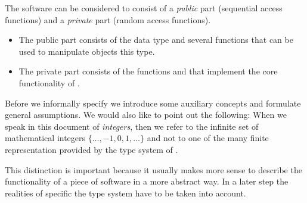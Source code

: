 The \bitwalker software can be considered to consist of a \emph{public} part
(sequential access functions)
and a \emph{private} part (random access functions).

\begin{itemize}
\item
The public part consists of the \isoc data type \bitwalkertype and several \isoc functions
that can be used to manipulate objects this type.

\item
The private part consists of the functions \peek and \poke
that implement the core functionality of \bitwalker.
\end{itemize}

Before we informally specify \bitwalker
we introduce some auxiliary concepts and formulate general assumptions.
We would also like to point out the following:
When we speak in this document of \emph{integers},
then we refer to the infinite set of mathematical
integers $\{\ldots, -1, 0, 1, \ldots\}$
and not to one of the many finite representation provided by the type system of \isoc.

This distinction is important because it usually makes more sense
to describe the functionality of a piece of software in a more
abstract way.
In a later step the realities of specific the \isoc type system
have to be taken into account.

